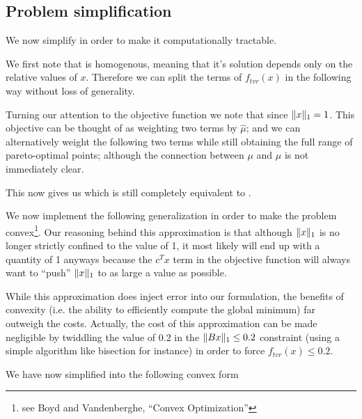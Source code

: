 \documentclass{article}
\begin{document}
\subsection{Problem simplification}
    We now simplify  in order 
        to make it computationally tractable.

    We first note that  is homogenous,
        meaning that it's solution depends only on the relative values of $x$.
    Therefore we can split the terms of $f_{tvr}(x)$ in the following way
        without loss of generality.

    Turning our attention to the objective function we note that
        since $\|x\|_1 = 1$.
    This objective can be thought of as 
        weighting two terms by $\hat{\mu}$;
        and we can alternatively weight the following two terms
        while still obtaining the full range of pareto-optimal points;
        although the connection between $\mu$ and $\hat{\mu}$
        is not immediately clear.

    This now gives us
        which is still completely equivalent to .

    We now implement the following generalization
        in order to make the problem 
        convex\footnote{see Boyd and Vandenberghe, ``Convex Optimization''}.
    Our reasoning behind this approximation
        is that although $\|x\|_1$ is no longer 
        strictly confined to the value of 1,
        it most likely will end up with a quantity of 1 anyways
        because the $c^T x$ term in the objective function will always want
        to ``push'' $\|x\|_1$ to as large a value as possible.

    While this approximation does inject error into our formulation,
        the benefits of convexity (i.e. the ability to efficiently compute
        the global minimum) far outweigh the costs.
    Actually, the cost of this approximation can be made negligible by
        twiddling the value of $0.2$ 
        in the $\|Bx\|_1 \le 0.2$ constraint 
        (using a simple algorithm like bisection for instance)
        in order to force $f_{tvr}(x) \le 0.2$.
    
    We have now simplified  into the following convex form
    
    
\end{document}
